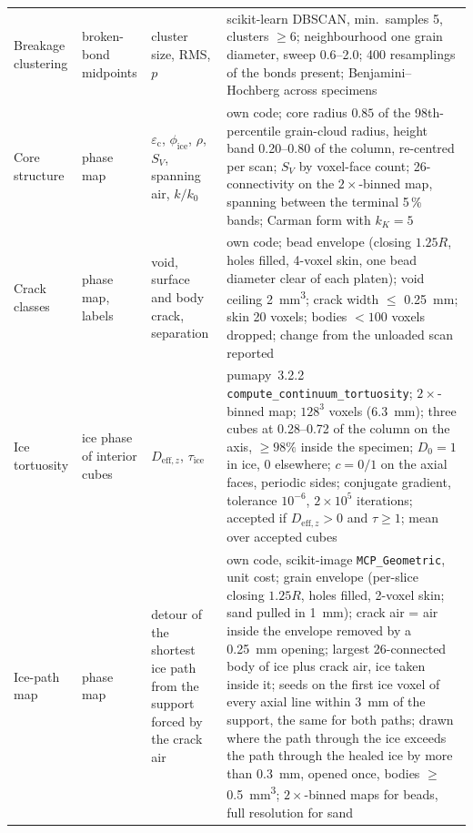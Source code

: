 {\begin{longtable}{p{2.4cm}p{2.6cm}p{2.4cm}>{\raggedright\arraybackslash}p{5.6cm}}
      Breakage clustering & broken-bond midpoints & cluster size, RMS, $p$ & scikit-learn DBSCAN, min.\ samples 5, clusters $\geq 6$; neighbourhood one grain diameter, sweep 0.6--2.0; 400 resamplings of the bonds present; Benjamini--Hochberg across specimens \\
      Core structure & phase map & $\varepsilon_\mathrm{c}$, $\phi_\mathrm{ice}$, $\rho$, $S_V$, spanning air, $k/k_0$ & own code; core radius $0.85$ of the 98th-percentile grain-cloud radius, height band 0.20--0.80 of the column, re-centred per scan; $S_V$ by voxel-face count; 26-connectivity on the $2\times$-binned map, spanning between the terminal 5\,\% bands; Carman form with $k_K = 5$ \\
      Crack classes & phase map, labels & void, surface and body crack, separation & own code; bead envelope (closing $1.25R$, holes filled, 4-voxel skin, one bead diameter clear of each platen); void ceiling \SI{2}{\milli\meter\cubed}; crack width $\leq$ \SI{0.25}{\milli\meter}; skin 20 voxels; bodies $< 100$ voxels dropped; change from the unloaded scan reported \\
      Ice tortuosity & ice phase of interior cubes & $D_{\mathrm{eff},z}$, $\tau_\mathrm{ice}$ & pumapy~3.2.2 \texttt{compute\_continuum\_tortuosity}; $2\times$-binned map; $128^3$ voxels (\SI{6.3}{\milli\meter}); three cubes at 0.28--0.72 of the column on the axis, $\geq 98\%$ inside the specimen; $D_0 = 1$ in ice, 0 elsewhere; $c = 0/1$ on the axial faces, periodic sides; conjugate gradient, tolerance $10^{-6}$, $2\times10^5$ iterations; accepted if $D_{\mathrm{eff},z} > 0$ and $\tau \geq 1$; mean over accepted cubes \\
      Ice-path map & phase map & detour of the shortest ice path from the support forced by the crack air & own code, scikit-image \texttt{MCP\_Geometric}, unit cost; grain envelope (per-slice closing $1.25R$, holes filled, 2-voxel skin; sand pulled in \SI{1}{\milli\meter}); crack air = air inside the envelope removed by a \SI{0.25}{\milli\meter} opening; largest 26-connected body of ice plus crack air, ice taken inside it; seeds on the first ice voxel of every axial line within \SI{3}{\milli\meter} of the support, the same for both paths; drawn where the path through the ice exceeds the path through the healed ice by more than \SI{0.3}{\milli\meter}, opened once, bodies $\geq$ \SI{0.5}{\milli\meter\cubed}; $2\times$-binned maps for beads, full resolution for sand \\
      \bottomrule
   \end{longtable}}